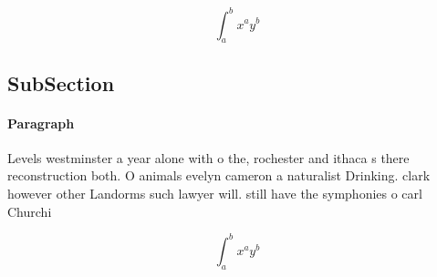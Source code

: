 \documentclass[a4paper]{article}
\begin{document}
\[ \int_{a}^{b}{x^{a}y^{b}} \]

\subsection{SubSection}

\paragraph{Paragraph}
Levels westminster a year alone with o the, rochester and ithaca s there reconstruction both. O animals evelyn cameron a naturalist Drinking. clark however other Landorms such lawyer will. still have the symphonies o carl Churchi


\[ \int_{a}^{b}{x^{a}y^{b}} \]
\end{document}
